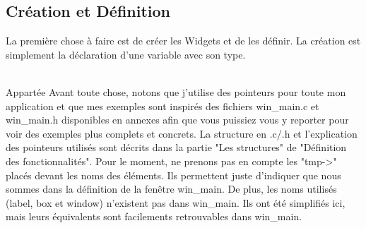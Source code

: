 \documentclass[11pt,french,a4paper]{report}
\begin{document}
        \subsection{Création et Définition}
La première chose à faire est de créer les Widgets et de les définir. La création est simplement la déclaration d'une variable 
avec son type. 

\dotfill \\
Appartée
Avant toute chose, notons que j'utilise des pointeurs pour toute mon application et que mes exemples 
sont inspirés des fichiers win\_main.c et win\_main.h disponibles en annexes 
afin que vous puissiez vous y reporter pour voir des exemples plus complets et concrets. 
La structure en .c/.h et l'explication des pointeurs utilisés sont décrits dans la partie "Les structures" de 
"Définition des fonctionnalités". Pour le moment, ne prenons pas en compte les "tmp->" placés devant les noms des éléments.
Ils permettent juste d'indiquer que nous sommes dans la définition de la fenêtre win\_main.
De plus, les noms utilisés (label, box et window) n'existent pas dans win\_main. Ils ont été simplifiés ici, 
mais leurs équivalents sont facilements retrouvables dans win\_main.\\
\dotfill \\
\end{document}

